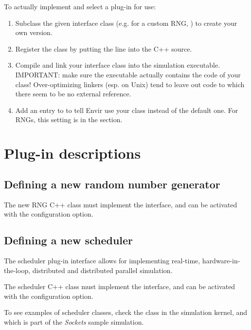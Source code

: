 To actually implement and select a plug-in for use:

\begin{enumerate}
   \item Subclass the given interface class (e.g. for a custom RNG, )
     to create your own version.
   \item Register the class by putting the 
     line into the C++ source.
   \item Compile and link your interface class into the {\opp} simulation
     executable. IMPORTANT: make sure the executable actually contains
     the code of your class! Over-optimizing linkers (esp. on Unix)
     tend to leave out code to which there seem to be no external reference.
   \item Add an entry to  to tell Envir use your class
     instead of the default one. For RNGs, this setting is 
     in the \ttt{[General]} section.
\end{enumerate}


\section{Plug-in descriptions}


\subsection{Defining a new random number generator}
\label{sec:plugin-exts:rng}

The new RNG C++ class must implement the  interface,
and can be activated with the  configuration option.


\subsection{Defining a new scheduler}
\label{sec:plugin-exts:scheduler}

The scheduler plug-in interface allows for implementing real-time,
hardware-in-the-loop, distributed and distributed parallel simulation.

The scheduler C++ class must implement the  interface,
and can be activated with the  configuration option.

To see examples of scheduler classes, check the 
class in the simulation kernel, and  which is part
of the \textit{Sockets} sample simulation.


